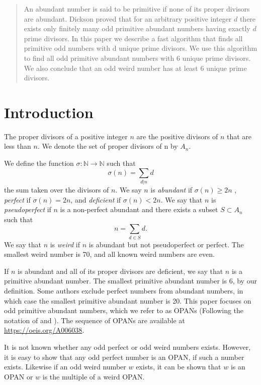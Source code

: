 \documentclass[../paper.tex]{article}
\begin{document}
\begin{abstract}
An abundant number is said to be primitive if none of its proper 
divisors are abundant.  Dickson proved that for an arbitrary
positive integer $d$ there exists only finitely many odd primitive
abundant numbers having exactly $d$ prime divisors\cite{dickson}.
In this paper we describe a fast algorithm
that finds all primitive odd numbers with d unique prime divisors. 
We use this algorithm to find all odd primitive 
abundant numbers with 6 unique prime divisors. We also conclude that an 
odd weird number has at least 6 unique prime divisors.
\end{abstract}

\section{Introduction}
The proper divisors of a positive integer $n$ are the positive
divisors of $n$ that are less than $n$. We denote the set of 
proper divisors of n by $\textit{A}_{n}$.

We define the function 
%
$\sigma: \mathbb{N} \rightarrow \mathbb{N}$
%
such that
%
$$\sigma(n) = \sum_{d|n}d$$
%
the sum taken over the divisors of $n$. We say $n$ is 
\textit{abundant} if $\sigma(n) \geq 2n$ \footnotemark
, \textit{perfect} if $\sigma(n) = 2n$, and \textit{deficient} if 
$\sigma(n) < 2n$. We say that $n$ is \textit{pseudoperfect} if 
$n$ is a non-perfect abundant and there exists a subset $ S 
\subset \textit{A}_{n}$ such that
%
%
%
$$ n = \sum_{d \in S} d .$$
%
We say that $n$ is \textit{weird} if $n$ is abundant but not 
pseudoperfect or perfect. The smallest weird number is 70, and 
all known weird numbers are even.

If $n$ is abundant and all of its proper divisors are deficient,
we say that $n$ is a primitive abundant number. The smallest primitive abundant number is 6, by our definition. Some authors exclude perfect
numbers from abundant numbers, in which case the smallest primitive abundant
number is 20.
This paper focuses
on odd primitive abundant numbers, which we refer to as OPANs
(Following the notation of \cite{valdas} and \cite{amato}). The sequence
of OPANs are available at \url{https://oeis.org/A006038}.\cite{oeis}

It is not known whether any odd perfect or odd weird numbers
exists. However, it is easy to show that any odd perfect number is
an OPAN, if such a number exists. Likewise if an odd weird number
$w$ exists, it can be shown that $w$ is an OPAN or $w$ is the
multiple of a weird OPAN.
\end{document}
